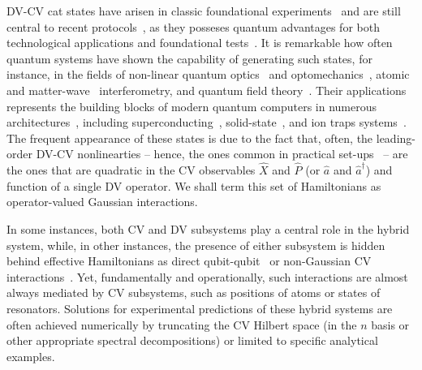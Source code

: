 \documentclass[%
reprint,
superscriptaddress,
nofootinbib,
 amsmath,amssymb,
prx,
floatfix,
]{revtex4-2}
\begin{document}
DV-CV cat states have arisen in classic foundational experiments~\cite{Monroe_Schrodinger_1996,brune_observing_1996} and are still central to recent protocols~\cite{cavailles_demosntration_2018,schrodinger_bild_2023,Realization_Xiaozhou_2025}, as they posseses quantum advantages for both technological applications and foundational tests~\cite{Sanders_2012,Munro_weekforce_2002,Stob_violation_2007,Leghtas_Hardware_2013,Mirrahimi_Dynamically_2014,Bergmann_quantum_2016,wbhn-v1sw}. It is remarkable how often quantum systems have shown the capability of generating such states, for instance, in the fields of non-linear quantum optics~\cite{gerry_quantum_1997,serafini_minimum_2004} and optomechanics~\cite{bose_preparation_1997,bose_scheme_1999,qvarfort_time-evolution_2020,marchese2026cascadedoptomechanicalsensingsmall}, atomic~\cite{machluf_coherent_2013,Amit_T_2019,margalit_realization_2020,keil_stern_2021} and matter-wave~\cite{bose_qubit_2006,Romero_Isart_quantum_2011,scala_matter_2013} interferometry, and quantum field theory~\cite{Funai_gaussian_2025,sun2026representationtheoryinhomogeneousgaussian}. Their applications represents the building blocks of modern quantum computers in numerous architectures~\cite{xiang_hybrid_2013}, including superconducting~\cite{strong_wallraff_2004,coherent_chiorescu_2004,blais_quantum_2007,coupling_majer_2007}, solid-state~\cite{strong_samkharadze_2018,strong_samkharadze_2018,coherent_mi_2018,coherent_landig_2018,strong_kubo_2010,strong_chen_2018,realization_liu_2023}, and ion traps systems~\cite{cirac_quantum_1995,sorensen_quantum_1999,leibfried_quantum_2003,haljan_spin_2005,Fluhmann2019,gan_hybrid_2020}.  The frequent appearance of these states is due to the fact that, often, the leading-order DV-CV nonlinearties -- hence, the ones common in practical set-ups~\cite{florian_ion_2001,webb_resilient_2018,kaku2025suddendecoherenceresonantparticle,tobar2025quantummetasurfacesprobesvacuum,ayyash2025multimodequbitconditionaloperationsgeneralized,Ayyash_driven} -- are the ones that are quadratic in the CV observables $\hat{X}$ and $\hat{P}$ (or $\hat{a}$ and $\hat{a}^\dag$) and function of a single DV operator. We shall term this set of  Hamiltonians as operator-valued Gaussian interactions. 

In some instances, both CV and DV subsystems play a central role in the hybrid system, while, in other instances, the presence of either subsystem is hidden behind effective Hamiltonians as direct qubit-qubit~\cite{Kentaro_crosscross_2021} or non-Gaussian CV interactions~\cite{semiao_kerr_2009,Nigg_black_2012,Leghtas_deterministic_2013}. Yet, fundamentally and operationally, such interactions are almost always mediated by CV subsystems, such as positions of atoms or states of resonators. Solutions for experimental predictions of these hybrid systems are often achieved numerically by truncating the CV Hilbert space (in the $n$ basis or other appropriate spectral decompositions) or limited to specific analytical examples.
\end{document}
